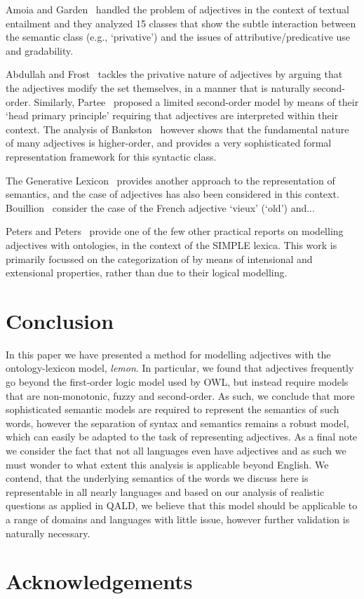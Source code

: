 \documentclass[11pt]{article}
\begin{document}
Amoia and Garden~ handled the problem of adjectives in the context of textual entailment and they analyzed 15 classes that show the subtle interaction between the semantic class (e.g., `privative') and the issues of attributive/predicative use and gradability. 

Abdullah and Frost~ tackles the privative nature of adjectives by arguing that the adjectives modify the set themselves, in a manner that is naturally second-order. Similarly, Partee~ proposed a limited second-order model by means of their `head primary principle' requiring that adjectives are interpreted within their context. The analysis of Bankston~ however shows that the fundamental nature of many adjectives is higher-order, and provides a very sophisticated formal representation framework for this syntactic class.

The Generative Lexicon~\cite{pustejovsky1991generative} provides another approach to the representation of semantics, and the case of adjectives has also been considered in this context. Bouillion~ consider the case of the French adjective `vieux' (`old') and...

Peters and Peters~ provide one of the few other practical reports on modelling adjectives with ontologies, in the context of the SIMPLE lexica. This work is primarily focussed on the categorization of by means of intensional and extensional properties, rather than due to their logical modelling. 

\section{Conclusion}

In this paper we have presented a method for modelling adjectives with the
ontology-lexicon model, \emph{lemon}. In particular, we found that adjectives
frequently go beyond the first-order logic model used by OWL, but instead 
require models that are non-monotonic, fuzzy and second-order. As such, we 
conclude that more sophisticated semantic models are required to represent the semantics
of such words, however the separation of syntax and semantics remains a robust
model, which can easily be adapted to the task of representing adjectives. As 
a final note we consider the fact that not all languages even have adjectives
\cite{?} and as such we must wonder to what extent this analysis is applicable
beyond English. We contend, that the underlying semantics of the words we discuss here
is representable in all nearly languages and based on our analysis of realistic
questions as applied in QALD, we believe that this model should be applicable
to a range of domains and languages with little issue, however further 
validation is naturally necessary.

\section*{Acknowledgements}



\end{document}

